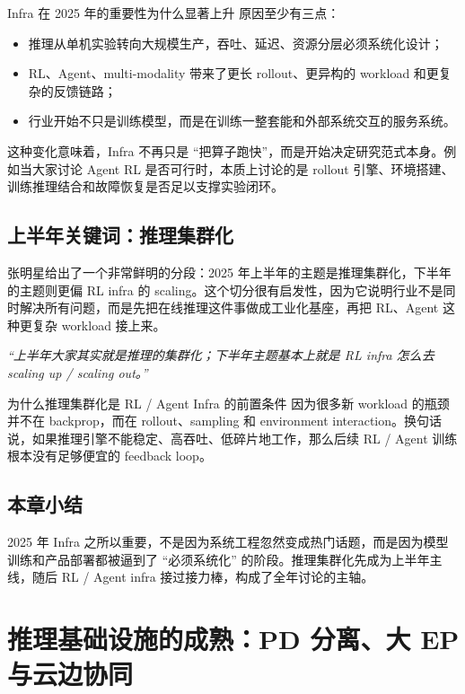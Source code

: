 \documentclass[a4paper]{article}
\begin{document}
\begin{importantbox}{Infra 在 2025 年的重要性为什么显著上升}
原因至少有三点：
\begin{itemize}
  \item 推理从单机实验转向大规模生产，吞吐、延迟、资源分层必须系统化设计；
  \item RL、Agent、multi-modality 带来了更长 rollout、更异构的 workload 和更复杂的反馈链路；
  \item 行业开始不只是训练模型，而是在训练一整套能和外部系统交互的服务系统。
\end{itemize}
\end{importantbox}

这种变化意味着，Infra 不再只是 ``把算子跑快''，而是开始决定研究范式本身。例如当大家讨论 Agent RL 是否可行时，本质上讨论的是 rollout 引擎、环境搭建、训练推理结合和故障恢复是否足以支撑实验闭环。

\subsection{上半年关键词：推理集群化}
张明星给出了一个非常鲜明的分段：2025 年上半年的主题是推理集群化，下半年的主题则更偏 RL infra 的 scaling。这个切分很有启发性，因为它说明行业不是同时解决所有问题，而是先把在线推理这件事做成工业化基座，再把 RL、Agent 这种更复杂 workload 接上来。

\textit{``上半年大家其实就是推理的集群化；下半年主题基本上就是 RL infra 怎么去 scaling up / scaling out。''}

\begin{knowledgebox}{为什么推理集群化是 RL / Agent Infra 的前置条件}
因为很多新 workload 的瓶颈并不在 backprop，而在 rollout、sampling 和 environment interaction。换句话说，如果推理引擎不能稳定、高吞吐、低碎片地工作，那么后续 RL / Agent 训练根本没有足够便宜的 feedback loop。
\end{knowledgebox}

\subsection{本章小结}
2025 年 Infra 之所以重要，不是因为系统工程忽然变成热门话题，而是因为模型训练和产品部署都被逼到了 ``必须系统化'' 的阶段。推理集群化先成为上半年主线，随后 RL / Agent infra 接过接力棒，构成了全年讨论的主轴。

\section{推理基础设施的成熟：PD 分离、大 EP 与云边协同}
\end{document}
